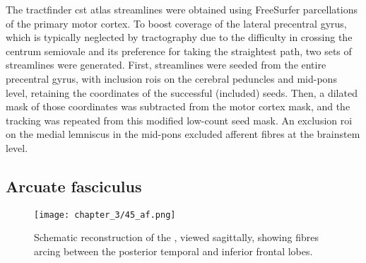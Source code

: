 The tractfinder \gls{cst} atlas streamlines were obtained using FreeSurfer parcellations \autocite{Desikan2006,FischlSalat2002} of the primary motor cortex.
To boost coverage of the lateral precentral gyrus, which is typically neglected by tractography due to the difficulty in crossing the centrum semiovale and its preference for taking the straightest path, two sets of streamlines were generated.
First, streamlines were seeded from the entire precentral gyrus, with inclusion \glspl{roi} on the cerebral peduncles and mid-pons level, retaining the coordinates of the successful (included) seeds.
Then, a dilated mask of those coordinates was subtracted from the motor cortex mask, and the tracking was repeated from this modified low-count seed mask.
An exclusion \gls{roi} on the medial lemniscus in the mid-pons excluded afferent fibres at the brainstem level.

\subsection{Arcuate fasciculus}

%

\begin{SCfigure}[][htb!]
  \texttt{[image: chapter\_3/45\_af.png]}
  \caption[Arcuate fasciculus]{Schematic reconstruction of the , viewed sagittally, showing fibres arcing between the posterior temporal and inferior frontal lobes.}
  \label{fig:af}
\end{SCfigure}

